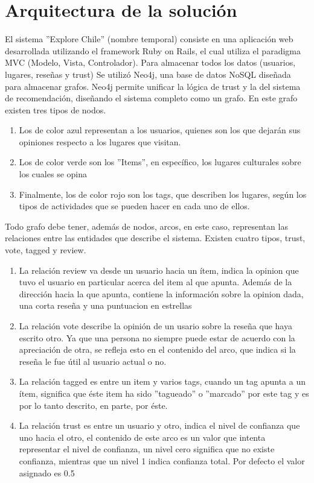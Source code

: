 \section{Arquitectura de la solución} 

El sistema ''Explore Chile'' (nombre temporal) consiste en una aplicación web desarrollada utilizando el framework Ruby on Rails, el cual utiliza el paradigma MVC (Modelo, Vista, Controlador). Para almacenar todos los datos (usuarios, lugares, reseñas y trust) Se utilizó Neo4j, una base de datos NoSQL diseñada para almacenar grafos. Neo4j permite unificar la lógica de trust y la del sistema de recomendación, diseñando el sistema completo como un grafo. En este grafo existen tres tipos de nodos.

\begin{enumerate}
\item{Los de color azul representan a los usuarios, quienes son los que dejarán sus opiniones respecto a los lugares que visitan.}
\item{Los de color verde son los ''Items'', en específico, los lugares culturales sobre los cuales se opina}
\item{Finalmente, los de color rojo son los tags, que describen los lugares, según los tipos de actividades que se pueden hacer en cada uno de ellos.}
\end{enumerate} 
Todo grafo debe tener, además de nodos, arcos, en este caso, representan las relaciones entre las entidades que describe el sistema. Existen cuatro tipos, trust, vote, tagged y review.
\begin{enumerate}
\item{La relación review va desde un usuario hacia un ítem, indica la opinion que tuvo el usuario en particular acerca del item al que apunta. Además de la dirección hacia la que apunta, contiene la información sobre la opinion dada, una corta reseña y una puntuacion en estrellas}
\item{La relación vote describe la opinión de un usario sobre la reseña que haya escrito otro. Ya que una persona no siempre puede estar de acuerdo con la apreciación de otra, se refleja esto en el contenido del arco, que indica si la reseña le fue útil al usuario actual o no.}
\item{La relación tagged es entre un item y varios tags, cuando un tag apunta a un ítem, significa que éste item ha sido ''tagueado'' o ''marcado'' por este tag y es por lo tanto descrito, en parte, por éste. }
\item{La relación trust es entre un usuario y otro, indica el nivel de confianza que uno hacia el otro, el contenido de este arco es un valor que intenta representar el nivel de confianza, un nivel cero significa que no existe confianza, mientras que un nivel 1 indica confianza total. Por defecto el valor asignado es 0.5}
\end{enumerate}


